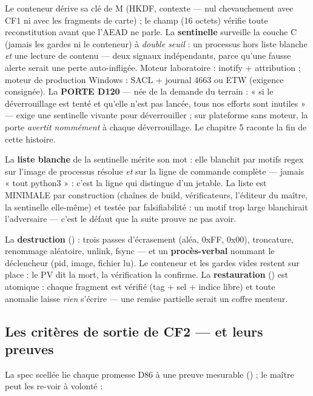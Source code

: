 Le conteneur  dérive sa clé de M (HKDF, contexte  —
nul chevauchement avec CF1 ni avec les fragments de carte) ; le champ 
(16 octets) vérifie toute reconstitution avant que l'AEAD ne parle. La
\textbf{sentinelle} surveille la couche C (jamais les gardes ni le conteneur) à
\emph{double seuil} : un processus hors liste blanche \emph{et} une lecture de
contenu — deux signaux indépendants, parce qu'une fausse alerte serait une perte
auto-infligée. Moteur laboratoire : inotify + attribution  ; moteur de
production Windows : SACL + journal 4663 ou ETW (exigence consignée). La
\textbf{PORTE D120} — née de la demande du terrain : « si le déverrouillage est tenté
et qu'elle n'est pas lancée, tous nos efforts sont inutiles » — exige une sentinelle
vivante pour déverrouiller ; sur plateforme sans moteur, la porte \emph{avertit
nommément} à chaque déverrouillage. Le chapitre 5 raconte la fin de cette histoire.

La \textbf{liste blanche} de la sentinelle mérite son mot : elle blanchit par motifs
regex sur l'image de processus résolue \emph{et} sur la ligne de commande complète —
jamais « tout python3 » : c'est la ligne qui distingue  d'un
 jetable. La liste est MINIMALE par construction (chaînes de build,
vérificateurs, l'éditeur du maître, la sentinelle elle-même) et testée par
falsifiabilité : un motif trop large blanchirait l'adversaire — c'est le défaut que
la suite prouve ne pas avoir.

La \textbf{destruction} () : trois passes d'écrasement (aléa, 0xFF, 0x00),
troncature, renommage aléatoire, unlink, fsync — et un \textbf{procès-verbal} nommant
le déclencheur (pid, image, fichier lu). Le conteneur et les gardes vides restent sur
place : le PV dit la mort, la vérification la confirme. La \textbf{restauration}
() est atomique : chaque fragment est vérifié (tag + sel + indice
libre) et toute anomalie laisse \emph{rien} s'écrire — une remise partielle serait un
coffre menteur.

\subsection{Les critères de sortie de CF2 — et leurs preuves}

La spec scellée lie chaque promesse D86 à une preuve mesurable
() ; le maître peut les re-voir à volonté :

